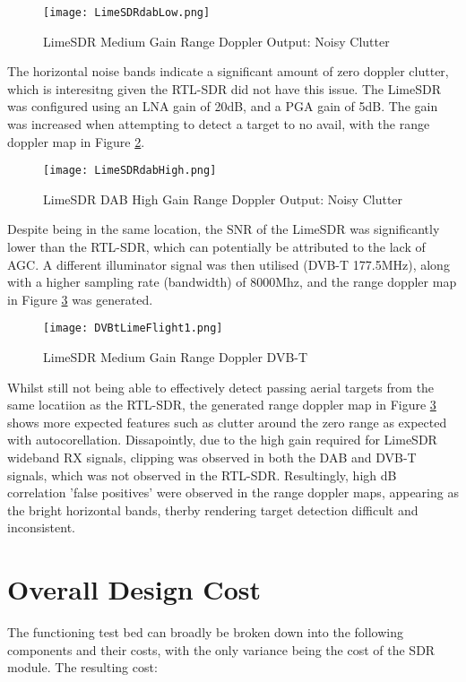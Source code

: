 \begin{figure}[h!]
    \centering
    \texttt{[image: LimeSDRdabLow.png]}
    \caption{LimeSDR Medium Gain Range Doppler Output: Noisy Clutter}
    \label{fig:RDM2}
\end{figure}

The horizontal noise bands indicate a significant amount of zero doppler clutter, which is interesitng given the RTL-SDR did not have this issue. The LimeSDR was configured using an LNA gain of 20dB, and a PGA gain of 5dB. The gain was increased when attempting to detect a target to no avail, with the range doppler map in Figure \ref{fig:RDMLimeHighGain}. 

\begin{figure}[h!]
    \centering
    \texttt{[image: LimeSDRdabHigh.png]}
    \caption{LimeSDR DAB High Gain Range Doppler Output: Noisy Clutter}
    \label{fig:RDMLimeHighGain}
\end{figure}

Despite being in the same location, the SNR of the LimeSDR was significantly lower than the RTL-SDR, which can potentially be attributed to the lack of AGC. A different illuminator signal was then utilised (DVB-T 177.5MHz), along with a higher sampling rate (bandwidth) of 8000Mhz, and the range doppler map in Figure \ref{fig:RDMLimeDVB} was generated.

\begin{figure}[h!]
    \centering
    \texttt{[image: DVBtLimeFlight1.png]}
    \caption{LimeSDR Medium Gain Range Doppler DVB-T}
    \label{fig:RDMLimeDVB}
\end{figure}

Whilst still not being able to effectively detect passing aerial targets from the same locatiion as the RTL-SDR, the generated range doppler map in Figure \ref{fig:RDMLimeDVB} shows more expected features such as clutter around the zero range as expected with autocorellation. Dissapointly, due to the high gain required for LimeSDR wideband RX signals, clipping was observed in both the DAB and DVB-T signals, which was not observed in the RTL-SDR. Resultingly, high dB correlation 'false positives' were observed in the range doppler maps, appearing as the bright horizontal bands, therby rendering target detection difficult and inconsistent.


\section{Overall Design Cost}
The functioning test bed can broadly be broken down into the following components and their costs, with the only variance being the cost of the SDR module. The resulting cost: 

